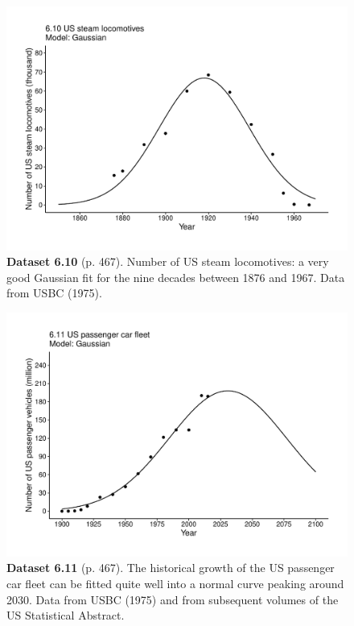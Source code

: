 \documentclass[aps,rmp,preprint,superscriptaddress,10pt,onecolumn]{article}
\begin{document}
\clearpage
\begin{figure}[h]
\includegraphics[width=\textwidth]{output/figs-ggplot/6.10.pdf}
\caption*{\textbf{Dataset 6.10} (p. 467). Number of US steam locomotives: a very good Gaussian fit for the nine decades between 1876 and 1967. Data from USBC (1975). }
\end{figure}
	
\clearpage
\begin{figure}[h]
\includegraphics[width=\textwidth]{output/figs-ggplot/6.11.pdf}
\caption*{\textbf{Dataset 6.11} (p. 467). The historical growth of the US passenger car fleet can be fitted quite well into a normal curve peaking around 2030. Data from USBC (1975) and from subsequent volumes of the US Statistical Abstract. }
\end{figure}
	
\end{document}
